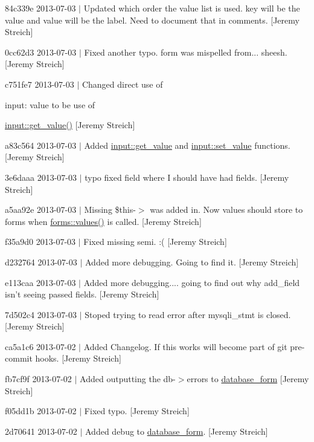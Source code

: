 \begin{DoxyItemize}
\item 84c339e 2013-\/07-\/03 $|$ Updated which order the value list is used. key will be the value and value will be the label. Need to document that in comments. \mbox{[}Jeremy Streich\mbox{]}
\item 0cc62d3 2013-\/07-\/03 $|$ Fixed another typo. form was mispelled from... sheesh. \mbox{[}Jeremy Streich\mbox{]}
\item c751fe7 2013-\/07-\/03 $|$ Changed direct use of \begin{DoxyParagraph}{input\-:}
value to be use of 
\end{DoxyParagraph}
\hyperlink{classinput_a1b3bcdbb596a1154a944a169ac67f547}{input\-::get\-\_\-value()} \mbox{[}Jeremy Streich\mbox{]}
\item a83c564 2013-\/07-\/03 $|$ Added \hyperlink{classinput_a1b3bcdbb596a1154a944a169ac67f547}{input\-::get\-\_\-value} and \hyperlink{classinput_a2383e00d55bf3dbcc7071b2fe1336aec}{input\-::set\-\_\-value} functions. \mbox{[}Jeremy Streich\mbox{]}
\item 3e6daaa 2013-\/07-\/03 $|$ typo fixed field where I should have had fields. \mbox{[}Jeremy Streich\mbox{]}
\item a5aa92e 2013-\/07-\/03 $|$ Missing \$this-\/$>$ was added in. Now values should store to forms when \hyperlink{classforms_ad66e3f3a4d5332bbd15e53680930d786}{forms\-::values()} is called. \mbox{[}Jeremy Streich\mbox{]}
\item f35a9d0 2013-\/07-\/03 $|$ Fixed missing semi. \-:( \mbox{[}Jeremy Streich\mbox{]}
\item d232764 2013-\/07-\/03 $|$ Added more debugging. Going to find it. \mbox{[}Jeremy Streich\mbox{]}
\item e113caa 2013-\/07-\/03 $|$ Added more debugging.... going to find out why add\-\_\-field isn't seeing passed fields. \mbox{[}Jeremy Streich\mbox{]}
\item 7d502c4 2013-\/07-\/03 $|$ Stoped trying to read error after mysqli\-\_\-stmt is closed. \mbox{[}Jeremy Streich\mbox{]}
\item ca5a1c6 2013-\/07-\/02 $|$ Added Changelog. If this works will become part of git pre-\/commit hooks. \mbox{[}Jeremy Streich\mbox{]}
\item fb7cf9f 2013-\/07-\/02 $|$ Added outputting the db-\/$>$errors to \hyperlink{classdatabase__form}{database\-\_\-form} \mbox{[}Jeremy Streich\mbox{]}
\item f05dd1b 2013-\/07-\/02 $|$ Fixed typo. \mbox{[}Jeremy Streich\mbox{]}
\item 2d70641 2013-\/07-\/02 $|$ Added debug to \hyperlink{classdatabase__form}{database\-\_\-form}. \mbox{[}Jeremy Streich\mbox{]}

\end{DoxyItemize}
